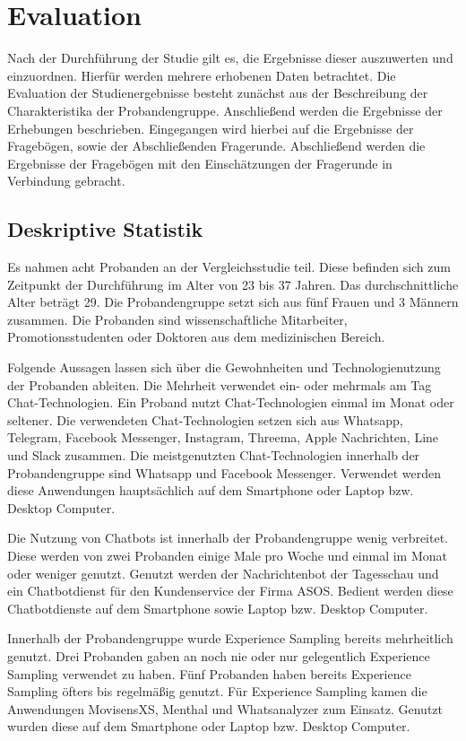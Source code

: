 \chapter{Evaluation}
\label{ch:evaluation}

Nach der Durchführung der Studie gilt es, die Ergebnisse dieser auszuwerten und einzuordnen. Hierfür werden mehrere erhobenen Daten betrachtet. Die Evaluation der Studienergebnisse besteht zunächst aus der Beschreibung der Charakteristika der Probandengruppe. Anschließend werden die Ergebnisse der Erhebungen beschrieben. Eingegangen wird hierbei auf die Ergebnisse der Fragebögen, sowie der Abschließenden Fragerunde. Abschließend werden die Ergebnisse der Fragebögen mit den Einschätzungen der Fragerunde in Verbindung gebracht. 


\section{Deskriptive Statistik}
Es nahmen acht Probanden an der Vergleichsstudie teil. Diese befinden sich zum Zeitpunkt der Durchführung im Alter von 23 bis 37 Jahren. Das durchschnittliche Alter beträgt 29. Die Probandengruppe setzt sich aus fünf Frauen und 3 Männern zusammen. Die Probanden sind wissenschaftliche Mitarbeiter, Promotionsstudenten oder Doktoren aus dem medizinischen Bereich. 

Folgende Aussagen lassen sich über die Gewohnheiten und Technologienutzung der Probanden ableiten. Die Mehrheit verwendet ein- oder mehrmals am Tag Chat-Technologien. Ein Proband nutzt Chat-Technologien 
einmal im Monat oder seltener. Die verwendeten Chat-Technologien setzen sich aus Whatsapp, Telegram, Facebook Messenger, Instagram, Threema, Apple Nachrichten, Line und Slack zusammen. Die meistgenutzten Chat-Technologien innerhalb der Probandengruppe sind Whatsapp und Facebook Messenger. Verwendet werden diese Anwendungen hauptsächlich auf dem Smartphone oder Laptop bzw. Desktop Computer. 

Die Nutzung von Chatbots ist innerhalb der Probandengruppe wenig verbreitet. Diese werden von zwei Probanden einige Male pro Woche und einmal im Monat oder weniger genutzt. Genutzt werden der Nachrichtenbot der Tagesschau und ein Chatbotdienst für den Kundenservice der Firma ASOS. Bedient werden diese Chatbotdienste auf dem Smartphone sowie Laptop bzw. Desktop Computer. 

Innerhalb der Probandengruppe wurde Experience Sampling bereits mehrheitlich genutzt. Drei Probanden gaben an noch nie oder nur gelegentlich Experience Sampling verwendet zu haben. Fünf Probanden haben bereits Experience Sampling öfters bis regelmäßig genutzt. Für Experience Sampling kamen die Anwendungen MovisensXS, Menthal und Whatsanalyzer zum Einsatz. Genutzt wurden diese auf dem Smartphone oder Laptop bzw. Desktop Computer. 

